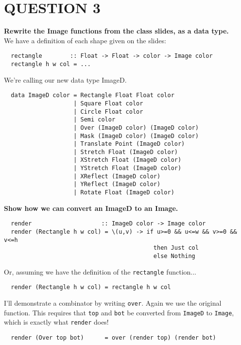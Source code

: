 \documentclass{article}
\begin{document}
\section*{QUESTION 3}
\textbf{Rewrite the Image functions from the class slides, as a data type.}\\
We have a definition of each shape given on the slides:
\begin{lstlisting}
  rectangle        :: Float -> Float -> color -> Image color
  rectangle h w col = ...
\end{lstlisting}
We're calling our new data type ImageD.
\begin{lstlisting}
  data ImageD color = Rectangle Float Float color
                    | Square Float color
                    | Circle Float color
                    | Semi color
                    | Over (ImageD color) (ImageD color)
                    | Mask (ImageD color) (ImageD color)
                    | Translate Point (ImageD color)
                    | Stretch Float (ImageD color)
                    | XStretch Float (ImageD color)
                    | YStretch Float (ImageD color)
                    | XReflect (ImageD color)
                    | YReflect (ImageD color)
                    | Rotate Float (ImageD color)
\end{lstlisting}

\noindent\textbf{Show how we can convert an ImageD to an Image.}

\begin{lstlisting}
  render                    :: ImageD color -> Image color
  render (Rectangle h w col) = \(u,v) -> if u>=0 && u<=w && v>=0 && v<=h 
                                           then Just col 
                                           else Nothing
\end{lstlisting}

\noindent Or, assuming we have the definition of the \lstinline{rectangle} function...
\begin{lstlisting}
  render (Rectangle h w col) = rectangle h w col
\end{lstlisting}

\noindent I'll demonstrate a combinator by writing \lstinline{over}.
Again we use the original function. This requires that \lstinline{top} and
\lstinline{bot} be converted from \lstinline{ImageD} to \lstinline{Image}, which is
exactly what \lstinline{render} does!
\begin{lstlisting}
  render (Over top bot)      = over (render top) (render bot)
\end{lstlisting}
\end{document}

